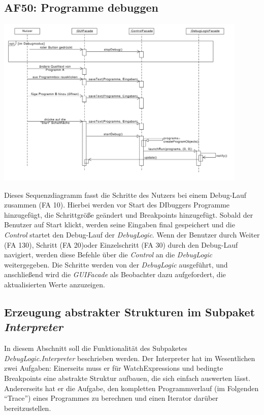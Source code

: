 \documentclass[parskip=full]{scrartcl}
\begin{document}
\newpage
\subsection{AF50: Programme debuggen}
\begin{center}
\includegraphics[width=0.9\textwidth]{diagrammIdeenUmlet/SequenceDiagrams/seq_AF50PDF.pdf}
\end{center}
Dieses Sequenzdiagramm fasst die Schritte des Nutzers bei einem Debug-Lauf zusammen (FA 10).
Hierbei werden vor Start des DIbuggers Programme hinzugefügt, die Schrittgröße geändert und Breakpoints hinzugefügt.
Sobald der Benutzer auf Start klickt, werden seine Eingaben final gespeichert und die \textit{Control} startet den Debug-Lauf der \textit{DebugLogic}.
Wenn der Benutzer durch Weiter (FA 130), Schritt (FA 20)oder Einzelschritt (FA 30) durch den Debug-Lauf navigiert, werden diese Befehle über die \textit{Control} an die \textit{DebugLogic} weitergegeben. 
Die Schritte werden von der \textit{DebugLogic} ausgeführt, und anschließend wird die \textit{GUIFacade} als Beobachter dazu aufgefordert, die aktualisierten Werte anzuzeigen.
\subsection{Erzeugung abstrakter Strukturen im Subpaket \textit{Interpreter}}
In diesem Abschnitt soll die Funktionalität des Subpaketes \textit{DebugLogic.Interpreter} beschrieben werden. 
Der Interpreter hat im Wesentlichen zwei Aufgaben: Einerseits muss er für WatchExpressions und bedingte Breakpoints eine abstrakte Struktur aufbauen, die sich einfach auswerten lässt. 
Andererseits hat er die Aufgabe, den kompletten Programmverlauf (im Folgenden \enquote{Trace})  eines Programmes zu berechnen und einen Iterator darüber bereitzustellen.
\end{document}
